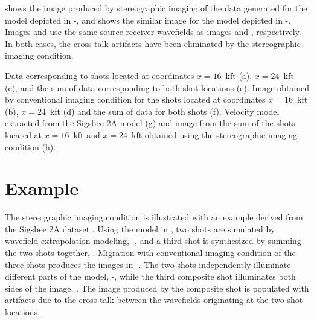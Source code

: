  shows the image produced by stereographic imaging of
the data generated for the model depicted in
-, and  shows the
similar image for the model depicted in
-.  Images  and
 use the same source receiver wavefields as images
 and , respectively.  In both cases, the
cross-talk artifacts have been eliminated by the stereographic imaging
condition.


{ Data corresponding to shots located at coordinates $x=16$~kft (a),
$x=24$~kft (c), and the sum of data corresponding to both shot
locations (e).  Image obtained by conventional imaging condition for
the shots located at coordinates $x=16$~kft (b), $x=24$~kft (d) and
the sum of data for both shots (f). Velocity model extracted from the
Sigsbee 2A model (g) and image from the sum of the shots located at
$x=16$~kft and $x=24$~kft obtained using the stereographic imaging
condition (h).}

\section{Example}
The stereographic imaging condition is illustrated with an example
derived from the Sigsbee 2A dataset \cite[]{SEG-2002-21222125}. Using
the model in , two shots are simulated by wavefield
extrapolation modeling, -, and
a third shot is synthesized by summing the two shots together,
. Migration with conventional imaging condition of
the three shots produces the images in
-. The two shots independently
illuminate different parts of the model,
-, while the third composite shot
illuminates both sides of the image, . The image
produced by the composite shot is populated with artifacts due to the
cross-talk between the wavefields originating at the two shot
locations.

